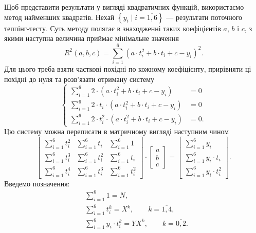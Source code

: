 Щоб представити результати у вигляді квадратичних функцій, використаємо
метод найменших квадратів.
Нехай $\left\{ y_i \mid i=\overline{1, 6} \right\}$ --- результати поточного
теппінг-тесту.
Суть методу полягає в знаходженні таких коефіцієнтів $a$, $b$ і $c$, з якими
наступна величина приймає мінімальне значення
\begin{equation*}
  R^2\left( a, b, c \right)
  = \sum_{i=1}^{6} \left( a \cdot t_i^2 + b \cdot t_i + c - y_i \right)^2.
\end{equation*}
Для цього треба взяти часткові похідні по кожному коефіцієнту, прирівняти ці
похідні до нуля та розв’язати отриману систему
\begin{equation*}
  \begin{cases}
    \sum_{i=1}^{6} 2 \cdot \left( a \cdot t_i^2 + b \cdot t_i + c - y_i \right)
    &= 0 \\
    \sum_{i=1}^{6} 2 \cdot t_i
      \cdot \left( a \cdot t_i^2 + b \cdot t_i + c - y_i \right)
    &= 0 \\
    \sum_{i=1}^{6} 2 \cdot t_i^2
      \cdot \left( a \cdot t_i^2 + b \cdot t_i + c - y_i \right)
    &= 0.
  \end{cases}
\end{equation*}
Цю систему можна переписати в матричному вигляді наступним чином
\begin{equation*}
  \begin{bmatrix}
    \sum_{i=1}^{6} t_i^2 & \sum_{i=1}^{6} t_i   & \sum_{i=1}^{6} 1 \\
    \sum_{i=1}^{6} t_i^3 & \sum_{i=1}^{6} t_i^2 & \sum_{i=1}^{6} t_i \\
    \sum_{i=1}^{6} t_i^4 & \sum_{i=1}^{6} t_i^3 & \sum_{i=1}^{6} t_i^2
  \end{bmatrix}
  \cdot
  \begin{bmatrix}
    a \\
    b \\
    c
  \end{bmatrix}
  =
  \begin{bmatrix}
    \sum_{i=1}^{6} y_i \\
    \sum_{i=1}^{6} y_i \cdot t_i \\
    \sum_{i=1}^{6} y_i \cdot t_i^2
  \end{bmatrix}.
\end{equation*}
Введемо позначення:
\begin{equation*}
  \begin{split}
    &\sum_{i=1}^{6} 1 = N, \\
    &\sum_{i=1}^{6} t_i^k = X^k,\qquad k=\overline{1, 4}, \\
    &\sum_{i=1}^{6} y_i \cdot t_i^k = YX^k,\qquad k=\overline{0, 2}.
  \end{split}
\end{equation*}
